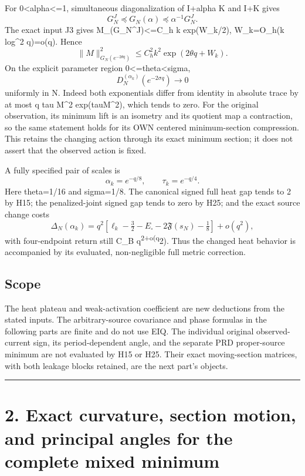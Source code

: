 For 0\textless alpha\textless=1, simultaneous diagonalization of I+alpha K and I+K gives \[
 G_N^J\preceq G_N(\alpha)\preceq\alpha^{-1}G_N^J.
 \tag{H24}
\] The exact input J3 gives \textbar\textbar M\textbar\textbar\_(G\_N\^{}J)\textless=C\_h k exp(W\_k/2), W\_k=O\_h(k log\^{}2 q)=o(q). Hence \[
 \|M\|_{G_N(e^{-2\theta q})}^2
 \le C_h^2k^2\exp(2\theta q+W_k).
\] On the explicit parameter region 0\textless=theta\textless sigma, \[
 \boxed{D_N^{(\alpha_k)}(e^{-2\sigma q})\longrightarrow0}\tag{H25}
\] uniformly in N. Indeed both exponentials differ from identity in absolute trace by at most q tau \textbar\textbar M\textbar\textbar\^{}2 exp(tau\textbar\textbar M\textbar\textbar\^{}2), which tends to zero. For the original observation, its minimum lift is an isometry and its quotient map a contraction, so the same statement holds for its OWN centered minimum-section compression. This retains the changing action through its exact minimum section; it does not assert that the observed action is fixed.

A fully specified pair of scales is \[
 \boxed{\alpha_k=e^{-q/8},\qquad\tau_k=e^{-q/4}.}\tag{H26}
\] Here theta=1/16 and sigma=1/8. The canonical signed full heat gap tends to 2 by H15; the penalized-joint signed gap tends to zero by H25; and the exact source change costs \[
 \Delta_N(\alpha_k)=q^2[\ell_k-\tfrac32-E_\square-2\mathfrak F(s_N)-\tfrac18]+o(q^2),
\] with four-endpoint return still C\_B q\textsuperscript{2+o(q}2). Thus the changed heat behavior is accompanied by its evaluated, non-negligible full metric correction.

\subsection{Scope}\label{scope}

The heat plateau and weak-activation coefficient are new deductions from the stated inputs. The arbitrary-source covariance and phase formulas in the following parts are finite and do not use EIQ. The individual original observed-current sign, its period-dependent angle, and the separate PRD proper-source minimum are not evaluated by H15 or H25. Their exact moving-section matrices, with both leakage blocks retained, are the next part's objects.

\begin{center}\rule{0.5\linewidth}{0.5pt}\end{center}

\section{2. Exact curvature, section motion, and principal angles for the complete mixed minimum}\label{exact-curvature-section-motion-and-principal-angles-for-the-complete-mixed-minimum}

